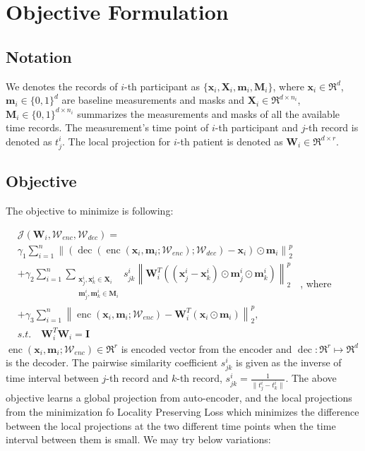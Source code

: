 \documentclass[letterpaper]{article} %
\begin{document}
\iffalse
No cold start problem, once trained, can be used to new patient's data without training phase.
Use latest record.
Feed the static data (gender, age) to autoencoder together.
Recall error in classification prediction results.
\fi

\section{Objective Formulation}
\subsection{Notation}
We denotes the records of $i$-th participant as $\{\mathbf{x}_i, \mathbf{X}_i, \mathbf{m}_i, \mathbf{M}_i\}$, where $\mathbf{x}_i \in \Re^{d}$, $\mathbf{m}_i \in \{0, 1\}^{d}$ are baseline measurements and masks and $\mathbf{X}_i \in \Re^{d \times n_i}$, $\mathbf{M}_i \in \{0, 1\}^{d \times n_i}$ summarizes the measurements and masks of all the available time records. The measurement's time point of $i$-th participant and $j$-th record is denoted as $t^i_j$. The local projection for $i$-th patient is denoted as $\mathbf{W}_i \in \Re^{d \times r}$.
\subsection{Objective}
The objective to minimize is following:

\begin{math}
    \begin{aligned}
    &\mathcal{J}(\mathbf{W}_i, \mathcal{W}_{enc}, \mathcal{W}_{dec})=\\
    &\gamma_1 \sum_{i = 1}^n \left\| (\operatorname{dec}(\operatorname{enc}(\mathbf{x}_i, \mathbf{m}_i; \mathcal{W}_{enc}); \mathcal{W}_{dec}) - \mathbf{x}_i) \odot \mathbf{m}_i \right\|_2^p\\ 
    &+ \gamma_2 \sum_{i=1}^n \sum\limits_{\substack{\mathbf{x}^i_j, \mathbf{x}^i_k \in \mathbf{X}_i \\ \mathbf{m}^i_j, \mathbf{m}^i_k \in \mathbf{M}_i}} s^i_{jk} \left\| \mathbf{W}_i^T ((\mathbf{x}^i_j - \mathbf{x}^i_k) \odot \mathbf{m}^i_j \odot \mathbf{m}^i_k)\right\|_2^p \\
    &+ \gamma_3 \sum_{i=1}^n \left\| \operatorname{enc}(\mathbf{x}_i, \mathbf{m}_i; \mathcal{W}_{enc}) - \mathbf{W}_i^T (\mathbf{x}_i \odot \mathbf{m}_i) \right\|_2^p,\\ 
    &s.t.\quad \mathbf{W}^T_i \mathbf{W}_i = \mathbf{I}
    \end{aligned}
\end{math}
, where $\operatorname{enc}(\mathbf{x}_i, \mathbf{m}_i; \mathcal{W}_{enc}) \in \Re^{r}$ is encoded vector from the encoder and $\operatorname{dec}: \Re^r \mapsto \Re^d$ is the decoder. The pairwise similarity coefficient $s^i_{jk}$ is given as the inverse of time interval between $j$-th record and $k$-th record, $s^i_{jk} = \frac{1}{\| t^i_j - t^i_k \|}$. The above objective learns a global projection from auto-encoder, and the local projections from the minimization fo Locality Preserving Loss which minimizes the difference between the local projections at the two different time points when the time interval between them is small. We may try below variations:
\end{document}
